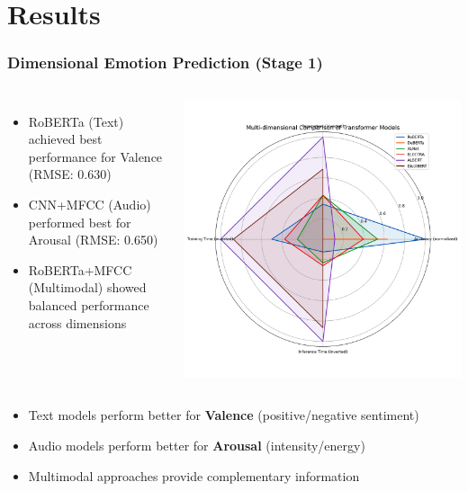 \section{Results}

\begin{frame}
\frametitle{Dimensional Emotion Prediction (Stage 1)}
\begin{columns}
\begin{itemize}
    \item RoBERTa (Text) achieved best performance for Valence (RMSE: 0.630)
    \item CNN+MFCC (Audio) performed best for Arousal (RMSE: 0.650)
    \item RoBERTa+MFCC (Multimodal) showed balanced performance across dimensions
\end{itemize}

\includegraphics[width=\textwidth]{figures/radar_comparison.png}
\end{columns}

\begin{itemize}
    \item Text models perform better for \textbf{Valence} (positive/negative sentiment)
    \item Audio models perform better for \textbf{Arousal} (intensity/energy)
    \item Multimodal approaches provide complementary information
\end{itemize}
\end{frame}

